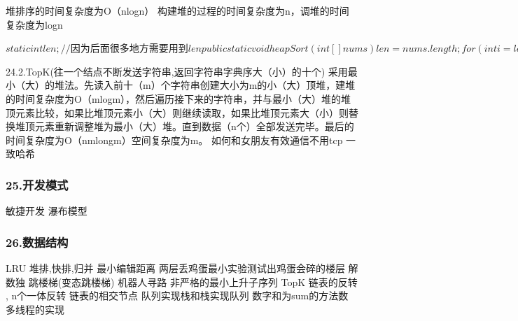 \documentclass[UTF8]{ctexart}
\begin{document}
堆排序的时间复杂度为O（nlogn） 构建堆的过程的时间复杂度为n，调堆的时间复杂度为logn

$
static int len ;//因为后面很多地方需要用到len
public static void heapSort(int[]nums){
   len =nums.length;
   for(int i =len/2;i>=0;i--){//建立最大堆的过程len=nums.length
       adjustMaxHeap(nums,i);
   }
   for(int i =len-1;i>=0;i--){
       int temp = nums[0];
       nums[0]=nums[i];
       nums[i]=temp;
       len--;
       adjustMaxHeap(nums,0);//传入的时候调整数组的长度在减少，所以len值在改变
   }
}
public static  void  adjustMaxHeap(int[] nums,int i) {
   int leftChild = 2 * i + 1;
   int rightChild = 2 * i + 2;
   int largest = i;
   if (leftChild < len\&\& nums[largest] < nums[leftChild]) {
       largest = leftChild;
   }
   if (rightChild < len \&\& nums[largest] < nums[rightChild]) {
       largest = rightChild;
   }
   if (largest != i) {
       int temp = nums[i];
       nums[i] = nums[largest];
       nums[largest] = temp;
       adjustMaxHeap(nums, largest);
   }
}
$

24.2.TopK(往一个结点不断发送字符串,返回字符串字典序大（小）的十个)
采用最小（大）的堆法。先读入前十（m）个字符串创建大小为m的小（大）顶堆，建堆的时间复杂度为O（mlogm），然后遍历接下来的字符串，并与最小（大）堆的堆顶元素比较，如果比堆顶元素小（大）则继续读取，如果比堆顶元素大（小）则替换堆顶元素重新调整堆为最小（大）堆。直到数据（n个）全部发送完毕。最后的时间复杂度为O（nmlongm）空间复杂度为m。
如何和女朋友有效通信不用tcp
一致哈希
\subsubsection{25.开发模式}
敏捷开发
瀑布模型
\subsubsection{26.数据结构}
LRU
堆排,快排,归并
最小编辑距离
两层丢鸡蛋最小实验测试出鸡蛋会碎的楼层
解数独
跳楼梯(变态跳楼梯)
机器人寻路
非严格的最小上升子序列
TopK
链表的反转 , n个一体反转
链表的相交节点
队列实现栈和栈实现队列
数字和为sum的方法数
多线程的实现
\end{document}

